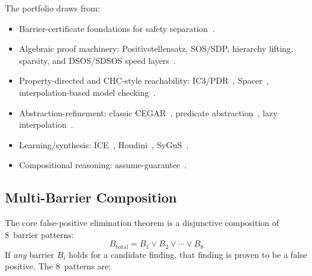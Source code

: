 \documentclass[sigconf,review,anonymous]{acmart}
\begin{document}
\noindent The portfolio draws from:
\begin{itemize}
  \item Barrier-certificate foundations for safety separation~\cite{prajna2004safety,prajna2007framework}.
  \item Algebraic proof machinery: Positivstellensatz, SOS/SDP, hierarchy lifting, sparsity, and DSOS/SDSOS speed layers~\cite{putinar1993positive,parrilo2003semidefinite,lasserre2001global,kojima2005sparsity,ahmadi2019dsos}.
  \item Property-directed and CHC-style reachability: IC3/PDR~\cite{bradley2011satbased}, Spacer~\cite{komuravelli2014smt}, interpolation-based model checking~\cite{mcmillan2003interpolation}.
  \item Abstraction-refinement: classic CEGAR~\cite{clarke2000counterexample}, predicate abstraction~\cite{clarke2004predicate}, lazy interpolation~\cite{mcmillan2006lazy}.
  \item Learning/synthesis: ICE~\cite{garg2014ice}, Houdini~\cite{flanagan2001houdini}, SyGuS~\cite{alur2013syntax}.
  \item Compositional reasoning: assume-guarantee~\cite{henzinger1998you}.
\end{itemize}

\subsection{Multi-Barrier Composition}

The core false-positive elimination theorem is a disjunctive composition of 8~barrier patterns:
\[
  B_{\text{total}} = B_1 \lor B_2 \lor \cdots \lor B_8
\]
If \emph{any} barrier $B_i$ holds for a candidate finding, that finding is proven to be a false positive.
The 8~patterns are:
\end{document}
